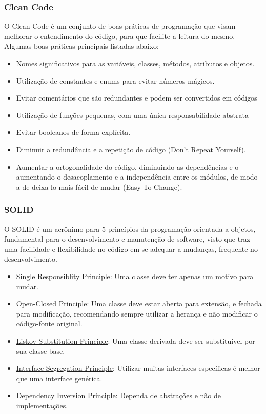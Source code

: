 \subsubsection{Clean Code}
O Clean Code é um conjunto de boas práticas de programação que visam melhorar o entendimento do código, para que facilite a leitura do mesmo. Algumas boas práticas principais listadas abaixo:

\begin{itemize}
    \item Nomes significativos para as variáveis, classes, métodos, atributos e objetos.
    \item Utilização de constantes e enums para evitar números mágicos.
    \item Evitar comentários que são redundantes e podem ser convertidos em códigos
    \item Utilização de funções pequenas, com uma única responsabilidade abstrata
    \item Evitar booleanos de forma explícita.
    \item Diminuir a redundância e a repetição de código (Don't Repeat Yourself).
    \item Aumentar a ortogonalidade do código, diminuindo as dependências e o aumentando o desacoplamento e a independência entre os módulos, de modo a de deixa-lo mais fácil de mudar (Easy To Change).
\end{itemize}

\subsubsection{SOLID}

O SOLID é um acrônimo para 5 princípios da programação orientada a objetos, fundamental para o desenvolvimento e manutenção de software, visto que traz uma facilidade e flexibilidade no código em se adequar a mudanças, frequente no desenvolvimento.

\begin{itemize}
    \item \underline{Single Responsiblity Principle}: Uma classe deve ter apenas um motivo para mudar.
    \item \underline{Open-Closed Principle}: Uma classe deve estar aberta para extensão, e fechada para modificação, recomendando sempre utilizar a herança e não modificar o código-fonte original.
    \item \underline{Liskov Substitution Principle}: Uma classe derivada deve ser substituível por sua classe base.
    \item \underline{Interface Segregation Principle}: Utilizar muitas interfaces específicas é melhor que uma interface genérica.
    \item \underline{Dependency Inversion Principle}: Dependa de abstrações e não de implementações.
\end{itemize}

